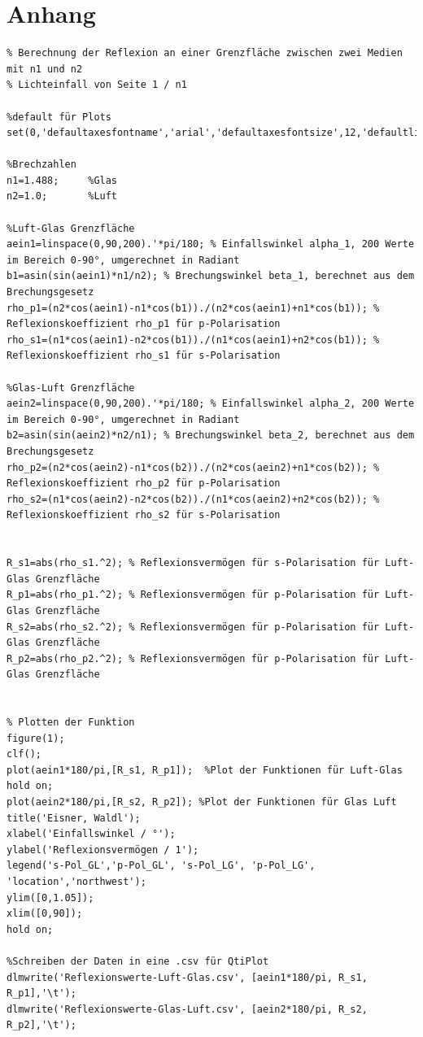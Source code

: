 \documentclass[12pt,a4paper,twoside]{article}
\begin{document}
\printbibliography[heading=bibintoc]

\section{Anhang}

\begin{lstlisting}
% Berechnung der Reflexion an einer Grenzfläche zwischen zwei Medien mit n1 und n2
% Lichteinfall von Seite 1 / n1

%default für Plots
set(0,'defaultaxesfontname','arial','defaultaxesfontsize',12,'defaultlinelinewidth',2);

%Brechzahlen
n1=1.488;     %Glas
n2=1.0;       %Luft             

%Luft-Glas Grenzfläche
aein1=linspace(0,90,200).'*pi/180; % Einfallswinkel alpha_1, 200 Werte im Bereich 0-90°, umgerechnet in Radiant
b1=asin(sin(aein1)*n1/n2); % Brechungswinkel beta_1, berechnet aus dem Brechungsgesetz
rho_p1=(n2*cos(aein1)-n1*cos(b1))./(n2*cos(aein1)+n1*cos(b1)); % Reflexionskoeffizient rho_p1 für p-Polarisation
rho_s1=(n1*cos(aein1)-n2*cos(b1))./(n1*cos(aein1)+n2*cos(b1)); % Reflexionskoeffizient rho_s1 für s-Polarisation

%Glas-Luft Grenzfläche
aein2=linspace(0,90,200).'*pi/180; % Einfallswinkel alpha_2, 200 Werte im Bereich 0-90°, umgerechnet in Radiant
b2=asin(sin(aein2)*n2/n1); % Brechungswinkel beta_2, berechnet aus dem Brechungsgesetz
rho_p2=(n2*cos(aein2)-n1*cos(b2))./(n2*cos(aein2)+n1*cos(b2)); % Reflexionskoeffizient rho_p2 für p-Polarisation
rho_s2=(n1*cos(aein2)-n2*cos(b2))./(n1*cos(aein2)+n2*cos(b2)); % Reflexionskoeffizient rho_s2 für s-Polarisation


R_s1=abs(rho_s1.^2); % Reflexionsvermögen für s-Polarisation für Luft-Glas Grenzfläche
R_p1=abs(rho_p1.^2); % Reflexionsvermögen für p-Polarisation für Luft-Glas Grenzfläche
R_s2=abs(rho_s2.^2); % Reflexionsvermögen für p-Polarisation für Luft-Glas Grenzfläche
R_p2=abs(rho_p2.^2); % Reflexionsvermögen für p-Polarisation für Luft-Glas Grenzfläche


% Plotten der Funktion
figure(1);
clf();
plot(aein1*180/pi,[R_s1, R_p1]);  %Plot der Funktionen für Luft-Glas
hold on;
plot(aein2*180/pi,[R_s2, R_p2]); %Plot der Funktionen für Glas Luft
title('Eisner, Waldl');
xlabel('Einfallswinkel / °');
ylabel('Reflexionsvermögen / 1');
legend('s-Pol_GL','p-Pol_GL', 's-Pol_LG', 'p-Pol_LG', 'location','northwest');
ylim([0,1.05]);
xlim([0,90]);
hold on;

%Schreiben der Daten in eine .csv für QtiPlot
dlmwrite('Reflexionswerte-Luft-Glas.csv', [aein1*180/pi, R_s1, R_p1],'\t');
dlmwrite('Reflexionswerte-Glas-Luft.csv', [aein2*180/pi, R_s2, R_p2],'\t');
\end{lstlisting}
\end{document}

